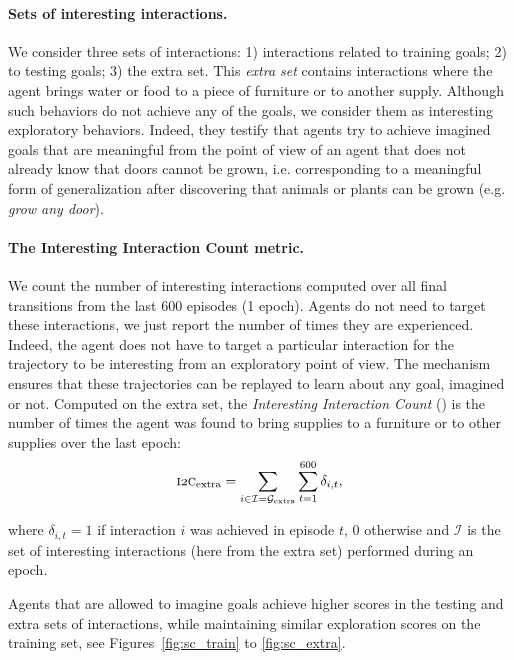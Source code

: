 \paragraph{Sets of interesting interactions.} We consider three sets of interactions: 1) interactions related to training goals; 2) to testing goals; 3) the extra set. This \textit{extra set} contains interactions where the agent brings water or food to a piece of furniture or to another supply. Although such behaviors do not achieve any of the goals, we consider them as interesting exploratory behaviors. Indeed, they testify that agents try to achieve imagined goals that are meaningful from the point of view of an agent that does not already know that doors cannot be grown, i.e. corresponding to a meaningful form of generalization after discovering that animals or plants can be grown (e.g. \textit{grow any door}). 

\paragraph{The Interesting Interaction Count metric.} 
We count the number of interesting interactions computed over all final transitions from the last $600$ episodes (1 epoch). Agents do not need to target these interactions, we just report the number of times they are experienced. Indeed, the agent does not have to target a particular interaction for the trajectory to be interesting from an exploratory point of view. The \her mechanism ensures that these trajectories can be replayed to learn about any goal, imagined or not. Computed on the extra set, the \textit{Interesting Interaction Count} (\itwoc) is the number of times the agent was found to bring supplies to a furniture or to other supplies over the last epoch: 
    \begin{displaymath}
    \itwoc_{\text{extra}} = \sum_{i\in \mathcal{I}=\G_\text{extra}} \sum_{t=1}^{600} \delta_{i,t},
    \end{displaymath}

    where $\delta_{i,t} = 1$ if interaction $i$ was achieved in episode $t$, $0$ otherwise and $\mathcal{I}$ is the set of interesting interactions (here from the extra set) performed during an epoch. 
    
Agents that are allowed to imagine goals achieve higher scores in the testing and extra sets of interactions, while maintaining similar exploration scores on the training set, see Figures~\ref{fig:sc_train} to \ref{fig:sc_extra}. 

